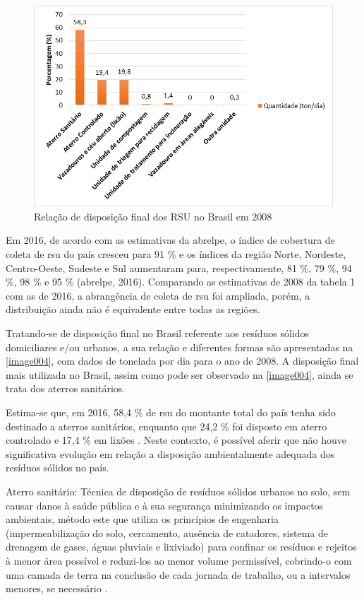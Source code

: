  \begin{figure}[h!]
	\centering
	\includegraphics[width=0.75\linewidth]{produtos/prodtres/image004}
	\caption{Relação de disposição final dos RSU no Brasil em 2008}
	\label{fig:image004}
\end{figure}

	Em 2016, de acordo com as estimativas da \gls{abrelpe}, o índice de cobertura de coleta de \gls{rsu} do país cresceu para 91 \% e os índices da região Norte, Nordeste, Centro-Oeste, Sudeste e Sul aumentaram para, respectivamente, 81 \%, 79 \%, 94 \%, 98 \% e 95 \% (\gls{abrelpe}, 2016). Comparando as estimativas de 2008 da tabela 1 com as de 2016, a abrangência de coleta de \gls{rsu} foi ampliada, porém, a distribuição ainda não é equivalente entre todas as regiões.
	
	Tratando-se de disposição final no Brasil referente aos resíduos sólidos domiciliares e/ou urbanos, a sua relação e diferentes formas são apresentadas na \autoref{image004}, com dados de tonelada por dia para o ano de 2008. A disposição final mais utilizada no Brasil, assim como pode ser observado na \autoref{image004}, ainda se trata dos aterros sanitários. 
	
	Estima-se que, em 2016, 58,4 \% de \gls{rsu} do montante total do país tenha sido destinado a aterros sanitários, enquanto que 24,2 \% foi disposto em aterro controlado e 17,4 \% em lixões \cite{abrelpe:2016}. Neste contexto, é possível aferir que não houve significativa evolução em relação a disposição ambientalmente adequada dos resíduos sólidos no país.
	
	Aterro sanitário: Técnica de disposição de resíduos sólidos urbanos no solo, sem causar danos à saúde pública e à sua segurança minimizando os	impactos ambientais, método este que utiliza os princípios de engenharia (impermeabilização do solo, cercamento, ausência de catadores, sistema de drenagem de gases, águas pluviais e lixiviado) para confinar os resíduos e rejeitos à menor área possível e reduzi-los ao menor volume permissível, cobrindo-o com uma camada de terra na conclusão de cada jornada de trabalho, ou a intervalos menores, se necessário \cite{ABNT:8419}.

